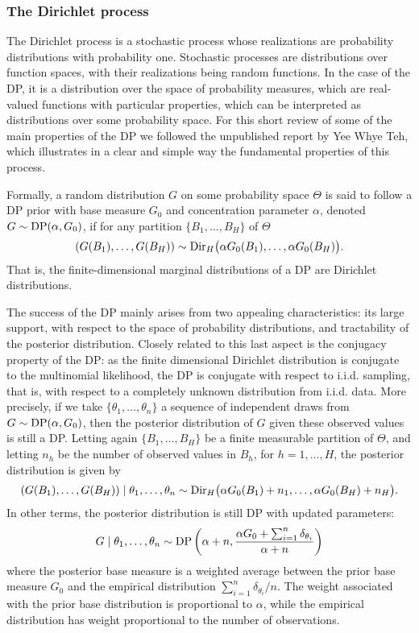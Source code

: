 \subsubsection*{The Dirichlet process }
The Dirichlet process is a stochastic process whose realizations are probability distributions with probability one. 
Stochastic processes are distributions over function spaces, with their realizations being random functions. In the case of the DP, it is a distribution over the space of probability measures, which are real-valued functions with particular properties, which can be interpreted as distributions over some probability space. For this short review of some of the main properties of the DP we followed the unpublished report by Yee Whye Teh, which illustrates in a clear and simple way the fundamental properties of this process.

Formally, a random distribution $G$ on some probability space $\Theta$ is said to follow a DP prior with base measure $G_0$ and concentration parameter $\alpha$, denoted $G\sim\mathrm{DP}(\alpha,G_0)$, if for any partition $\{B_1,\dots,B_H\}$ of $\Theta$
\begin{equation*}
(G(B_1),\dots,G(B_H)) \sim \mathrm{Dir}_H\big(\alpha G_0(B_1),\dots,\alpha G_0(B_H)\big).
\end{equation*}
That is, the finite-dimensional marginal distributions of a DP are Dirichlet distributions.

The success of the DP mainly arises from two appealing characteristics: its large support, with respect to the space of probability distributions, and tractability of the posterior distribution.
Closely related to this last aspect is the conjugacy property of the DP: as the finite dimensional Dirichlet distribution is conjugate to the multinomial likelihood, the DP is conjugate with respect to i.i.d. sampling, that is, with respect to a completely unknown distribution from i.i.d. data.
More precisely, if we take $\{\theta_1,\dots,\theta_n\}$ a sequence of independent draws from $G\sim\mathrm{DP}(\alpha,G_0)$, then the posterior distribution of $G$ given these observed values is still a DP. 
Letting again $\{B_1,\dots,B_H\}$ be a finite measurable partition of $\Theta$, and letting $n_h$ be the number of observed values in $B_h$, for $h = 1,\dots,H$, the posterior distribution is given by
\begin{equation*}
(G(B_1),\dots,G(B_H))\mid \theta_1,\dots,\theta_n \sim \mathrm{Dir}_H\big(\alpha G_0(B_1) + n_1,\dots,\alpha G_0(B_H) + n_H\big).
\end{equation*}
In other terms, the posterior distribution is still DP with updated parameters:
\begin{equation*}
G \mid \theta_1,\dots,\theta_n \sim \mathrm{DP} \left(\alpha + n, \frac{\alpha G_0 + \sum_{i=1}^n \delta_{\theta_i}}{\alpha + n} \right)
\end{equation*}
where the posterior base measure is a weighted average between the prior base measure $G_0$ and the empirical distribution $\sum_{i=1}^n \delta_{\theta_i} / n$.
The weight associated with the prior base distribution is proportional to $\alpha$, while the empirical distribution has weight proportional to the number of observations.



